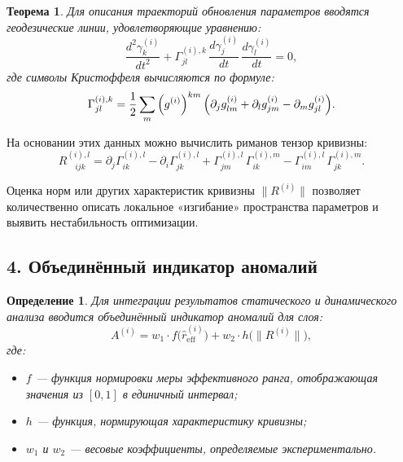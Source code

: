 \documentclass[a4paper,12pt]{article}
\newtheorem{theorem}{Теорема}
\newtheorem{definition}{Определение}
\begin{document}
\begin{theorem}
Для описания траекторий обновления параметров вводятся геодезические линии, удовлетворяющие уравнению:
\begin{equation}
\frac{d^2\gamma^{(i)}_k}{dt^2} + \Gamma^{(i),k}_{jl}\,\frac{d\gamma^{(i)}_j}{dt}\,\frac{d\gamma^{(i)}_l}{dt} = 0,
\end{equation}
где символы Кристоффеля вычисляются по формуле:
\begin{equation}
\Gamma^{(i),k}_{jl} = \frac{1}{2}\sum_{m}\left(g^{(i)}\right)^{km}\Bigl(\partial_j g^{(i)}_{lm} + \partial_l g^{(i)}_{jm} - \partial_m g^{(i)}_{jl}\Bigr).
\end{equation}
\end{theorem}

На основании этих данных можно вычислить риманов тензор кривизны:
\begin{equation}
R^{(i),l}_{\quad ijk} = \partial_j \Gamma^{(i),l}_{ik} - \partial_i \Gamma^{(i),l}_{jk} + \Gamma^{(i),l}_{jm}\,\Gamma^{(i),m}_{ik} - \Gamma^{(i),l}_{im}\,\Gamma^{(i),m}_{jk}.
\end{equation}

Оценка норм или других характеристик кривизны \(\|R^{(i)}\|\) позволяет количественно описать локальное «изгибание» пространства параметров и выявить нестабильность оптимизации.

\subsection*{4. Объединённый индикатор аномалий}

\begin{definition}
Для интеграции результатов статического и динамического анализа вводится объединённый индикатор аномалий для слоя:
\begin{equation}
A^{(i)} = w_1 \cdot f\bigl(\hat{r}_{\text{eff}}^{(i)}\bigr) + w_2 \cdot h\bigl(\|R^{(i)}\|\bigr),
\end{equation}
где:
\begin{itemize}[leftmargin=1.5cm]
    \item \( f \) --- функция нормировки меры эффективного ранга, отображающая значения из \([0,1]\) в единичный интервал;
    \item \( h \) --- функция, нормирующая характеристику кривизны;
    \item \( w_1 \) и \( w_2 \) --- весовые коэффициенты, определяемые экспериментально.
\end{itemize}
\end{definition}
\end{document}
